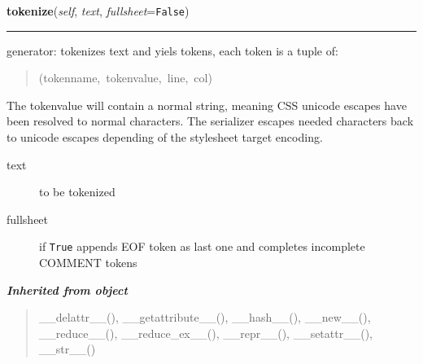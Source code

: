     \label{cssutils:tokenize2:Tokenizer:tokenize}

    \vspace{0.5ex}

\hspace{.8\funcindent}\begin{boxedminipage}{\funcwidth}

    \raggedright \textbf{tokenize}(\textit{self}, \textit{text}, \textit{fullsheet}={\tt False})

    \vspace{-1.5ex}

    \rule{\textwidth}{0.5\fboxrule}
\setlength{\parskip}{2ex}

generator: tokenizes text and yiels tokens, each token is a tuple of:
\begin{quote}{\ttfamily \raggedright \noindent
(tokenname,~tokenvalue,~line,~col)
}\end{quote}

The tokenvalue will contain a normal string, meaning CSS unicode
escapes have been resolved to normal characters. The serializer
escapes needed characters back to unicode escapes depending of
the stylesheet target encoding.
\begin{description}
\item[{text}] \leavevmode 
to be tokenized

\item[{fullsheet}] \leavevmode 
if \texttt{True} appends EOF token as last one and completes incomplete
COMMENT tokens

\end{description}
\setlength{\parskip}{1ex}
    \end{boxedminipage}


\large{\textbf{\textit{Inherited from object}}}

\begin{quote}
\_\_delattr\_\_(), \_\_getattribute\_\_(), \_\_hash\_\_(), \_\_new\_\_(), \_\_reduce\_\_(), \_\_reduce\_ex\_\_(), \_\_repr\_\_(), \_\_setattr\_\_(), \_\_str\_\_()
\end{quote}


